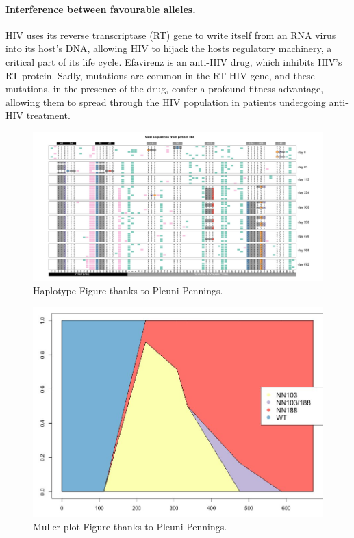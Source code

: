 \paragraph{Interference between favourable alleles.}

HIV uses its reverse transcriptase (RT) gene to write itself from an RNA virus into its host's DNA, allowing HIV to hijack the hosts regulatory machinery, a critical part of its life cycle. 
Efavirenz is an anti-HIV drug, which inhibits HIV's RT protein. Sadly, mutations are common in the RT HIV gene, and these mutations, in the presence of the drug, confer a profound fitness advantage, allowing them to spread through the HIV population in patients undergoing anti-HIV treatment. 

\begin{figure}
\begin{center}
  \includegraphics[width =  \textwidth]{Journal_figs/recom_selection/Pleuni_HIV_interference/DdwdkVeVMAA7t-V.jpg}
\end{center}
\caption{Haplotype Figure thanks to Pleuni Pennings.} \label{fig:HIV_interference}  %
\end{figure}

\begin{figure}
\begin{center}
  \includegraphics[width = 0.8 \textwidth]{Journal_figs/recom_selection/Pleuni_HIV_interference/DdweQyxU0AA7mXe.jpg}
\end{center}
\caption{Muller plot Figure thanks to Pleuni Pennings.} \label{fig:HIV_interference_M}  %
\end{figure}



